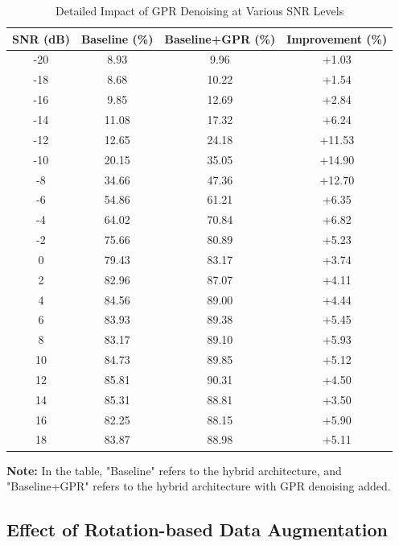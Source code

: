 \documentclass[conference]{IEEEtran}
\begin{document}
\begin{table}[!htbp]
\centering
\caption{Detailed Impact of GPR Denoising at Various SNR Levels}
\label{tab:gpr_detailed_snr}
\begin{threeparttable}
\begin{tabular}{@{}cccc@{}}
\toprule
SNR (dB) & Baseline (\%) & Baseline+GPR (\%) & Improvement (\%) \\
\midrule
-20 & 8.93 & 9.96 & +1.03 \\
-18 & 8.68 & 10.22 & +1.54 \\
-16 & 9.85 & 12.69 & +2.84 \\
-14 & 11.08 & 17.32 & +6.24 \\
-12 & 12.65 & 24.18 & +11.53 \\
-10 & 20.15 & 35.05 & +14.90 \\
-8 & 34.66 & 47.36 & +12.70 \\
-6 & 54.86 & 61.21 & +6.35 \\
-4 & 64.02 & 70.84 & +6.82 \\
-2 & 75.66 & 80.89 & +5.23 \\
0 & 79.43 & 83.17 & +3.74 \\
2 & 82.96 & 87.07 & +4.11 \\
4 & 84.56 & 89.00 & +4.44 \\
6 & 83.93 & 89.38 & +5.45 \\
8 & 83.17 & 89.10 & +5.93 \\
10 & 84.73 & 89.85 & +5.12 \\
12 & 85.81 & 90.31 & +4.50 \\
14 & 85.31 & 88.81 & +3.50 \\
16 & 82.25 & 88.15 & +5.90 \\
18 & 83.87 & 88.98 & +5.11 \\
\bottomrule
\end{tabular}
\begin{tablenotes}
\item[] \textbf{Note:} In the table, "Baseline" refers to the hybrid architecture, and "Baseline+GPR" refers to the hybrid architecture with GPR denoising added.
\end{tablenotes}
\end{threeparttable}
\end{table}




\subsection{Effect of Rotation-based Data Augmentation}
\end{document}
